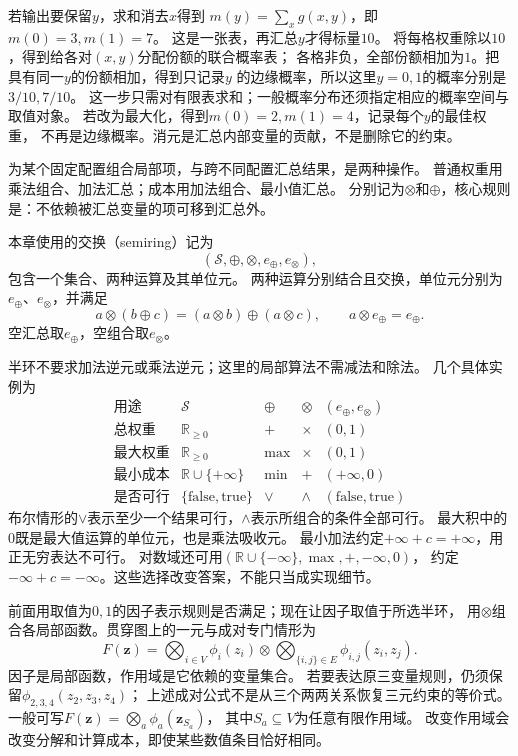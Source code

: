 若输出要保留\(y\)，求和消去\(x\)得到
\(m(y)=\sum_xg(x,y)\)，即\(m(0)=3,m(1)=7\)。
这是一张表，再汇总\(y\)才得标量\(10\)。
将每格权重除以\(10\)，得到给各对\((x,y)\)分配份额的联合概率表；
各格非负，全部份额相加为\(1\)。把具有同一\(y\)的份额相加，得到只记录\(y\)
的边缘概率，所以这里\(y=0,1\)的概率分别是\(3/10,7/10\)。
这一步只需对有限表求和；一般概率分布还须指定相应的概率空间与取值对象。
若改为最大化，得到\(m(0)=2,m(1)=4\)，记录每个\(y\)的最佳权重，
不再是边缘概率。消元是汇总内部变量的贡献，不是删除它的约束。

为某个固定配置组合局部项，与跨不同配置汇总结果，是两种操作。
普通权重用乘法组合、加法汇总；成本用加法组合、最小值汇总。
分别记为\(\otimes\)和\(\oplus\)，核心规则是：不依赖被汇总变量的项可移到汇总外。

\begin{definition}[交换半环]
  \label{def:graph-theory-semiring}
  本章使用的交换（semiring）记为
  \[
    (\mathcal S,\oplus,\otimes,e_{\oplus},e_{\otimes}),
  \]
  包含一个集合、两种运算及其单位元。
  两种运算分别结合且交换，单位元分别为\(e_{\oplus}\)、\(e_{\otimes}\)，并满足
  \[
    a\otimes(b\oplus c)=(a\otimes b)\oplus(a\otimes c),\qquad
    a\otimes e_{\oplus}=e_{\oplus}.
  \]
  空汇总取\(e_{\oplus}\)，空组合取\(e_{\otimes}\)。
\end{definition}

半环不要求加法逆元或乘法逆元；这里的局部算法不需减法和除法。
几个具体实例为
\[
  \begin{array}{c|c|c|c|c}
    \text{用途}&\mathcal S&\oplus&\otimes&(e_{\oplus},e_{\otimes})\\ \hline
    \text{总权重}&\mathbb R_{\geq0}&+&\times&(0,1)\\
    \text{最大权重}&\mathbb R_{\geq0}&\max&\times&(0,1)\\
    \text{最小成本}&\mathbb R\cup\{+\infty\}&\min&+&(+\infty,0)\\
    \text{是否可行}&\{\mathrm{false},\mathrm{true}\}&\lor&\land&
       (\mathrm{false},\mathrm{true})
  \end{array}
\]
布尔情形的$\lor$表示至少一个结果可行，$\land$表示所组合的条件全部可行。
最大积中的\(0\)既是最大值运算的单位元，也是乘法吸收元。
最小加法约定\(+\infty+c=+\infty\)，用正无穷表达不可行。
对数域还可用\((\mathbb R\cup\{-\infty\},\max,+,-\infty,0)\)，
约定\(-\infty+c=-\infty\)。这些选择改变答案，不能只当成实现细节。

前面用取值为\(0,1\)的因子表示规则是否满足；现在让因子取值于所选半环，
用\(\otimes\)组合各局部函数。贯穿图上的一元与成对专门情形为
\begin{equation}
  F(\bm z)=\bigotimes_{i\in V}\phi_i(z_i)
    \otimes\bigotimes_{\{i,j\}\in E}\phi_{i,j}(z_i,z_j).
  \label{eq:graph-theory-factorized-objective}
\end{equation}
因子是局部函数，作用域是它依赖的变量集合。
若要表达原三变量规则，仍须保留\(\phi_{2,3,4}(z_2,z_3,z_4)\)；
上述成对公式不是从三个两两关系恢复三元约束的等价式。
一般可写\(F(\bm z)=\bigotimes_a\phi_a(\bm z_{S_a})\)，
其中\(S_a\subseteq V\)为任意有限作用域。
改变作用域会改变分解和计算成本，即使某些数值条目恰好相同。


